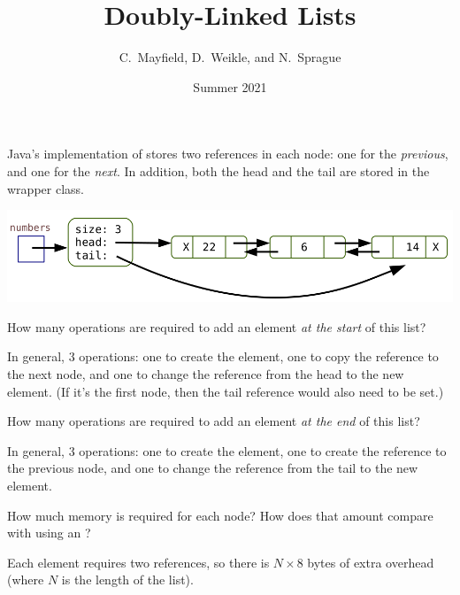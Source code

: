 \documentclass[12pt]{article}
\title{Doubly-Linked Lists}
\author{C.~Mayfield, D.~Weikle, and N.~Sprague}
\date{Summer 2021}
\begin{document}
\maketitle



Java's implementation of  stores two references in each node: one for the {\it previous}, and one for the {\it next}.
In addition, both the head and the tail are stored in the wrapper class.

\begin{center}
\includegraphics[scale=0.35]{doubly-linked.png}
\end{center}




\Q How many operations are required to add an element {\it at the start} of this list?

\begin{answer}
In general, 3 operations: one to create the element, one to copy the reference to the next node, and one to change the reference from the head to the new element.
(If it's the first node, then the tail reference would also need to be set.)
\end{answer}

\Q How many operations are required to add an element {\it at the end} of this list?

\begin{answer}
In general, 3 operations: one to create the element, one to create the reference to the previous node, and one to change the reference from the tail to the new element.
\end{answer}

\Q How much memory is required for each node?
How does that amount compare with using an ?

\begin{answer}
Each element requires two references, so there is $N \times 8$ bytes of extra overhead (where $N$ is the length of the list).
\end{answer}
\end{document}
